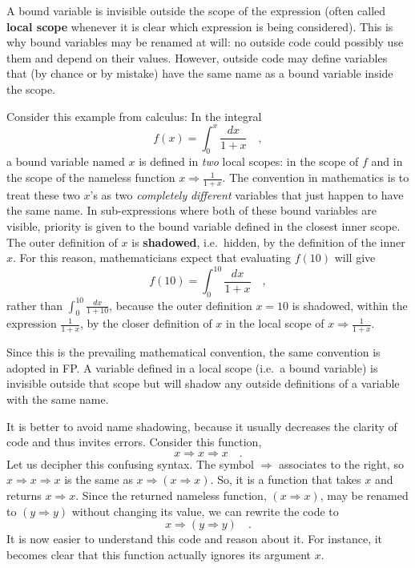 A bound variable is invisible outside the scope of the expression
(often called \textbf{local scope} whenever it
is clear which expression is being considered). This is why bound
variables may be renamed at will: no outside code could possibly use
them and depend on their values. However, outside code may define
variables that (by chance or by mistake) have the same name as a bound
variable inside the scope.

Consider this example from calculus: In the integral
\[
f(x)=\int_{0}^{x}\frac{dx}{1+x}\quad,
\]
a bound variable named $x$ is defined in \emph{two} local scopes:
in the scope of $f$ and in the scope of the nameless function $x\Rightarrow\frac{1}{1+x}$.
The convention in mathematics is to treat these two $x$'s as two
\emph{completely} \emph{different} variables that just happen to have
the same name. In sub-expressions where both of these bound variables
are visible, priority is given to the bound variable defined in the
closest inner scope. The outer definition of $x$ is \textbf{shadowed},
i.e.\ hidden, by the definition of the inner $x$. For this reason,
mathematicians expect that evaluating $f(10)$ will give
\[
f(10)=\int_{0}^{10}\frac{dx}{1+x}\quad,
\]
rather than $\int_{0}^{10}\frac{dx}{1+10}$, because the outer definition
$x=10$ is shadowed, within the expression $\frac{1}{1+x}$, by the
closer definition of $x$ in the local scope of $x\Rightarrow\frac{1}{1+x}$.

Since this is the prevailing mathematical convention, the same convention
is adopted in FP. A variable defined in a local scope (i.e.\ a bound
variable) is invisible outside that scope but will shadow any outside
definitions of a variable with the same name. 

It is better to avoid name shadowing, because it usually decreases
the clarity of code and thus invites errors. Consider this function,
\[
x\Rightarrow x\Rightarrow x\quad.
\]
Let us decipher this confusing syntax. The symbol $\Rightarrow$ associates
to the right, so $x\Rightarrow x\Rightarrow x$ is the same as $x\Rightarrow\left(x\Rightarrow x\right)$.
So, it is a function that takes $x$ and returns $x\Rightarrow x$.
Since the returned nameless function, $\left(x\Rightarrow x\right)$,
may be renamed to $\left(y\Rightarrow y\right)$ without changing
its value, we can rewrite the code to
\[
x\Rightarrow\left(y\Rightarrow y\right)\quad.
\]
It is now easier to understand this code and reason about it. For
instance, it becomes clear that this function actually ignores its
argument $x$.

